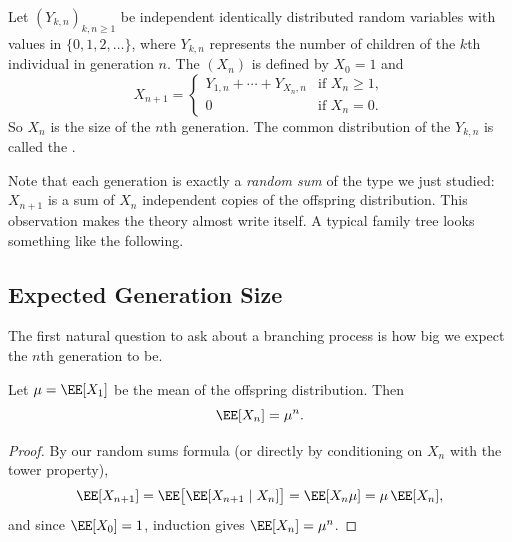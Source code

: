 \begin{definition}
	Let $(Y_{k, n})_{k, n \geq 1}$ be independent identically distributed random variables with values in $\{0, 1, 2, \dots\}$, where $Y_{k, n}$ represents the number of children of the $k$th individual in generation $n$. The  $(X_n)$ is defined by $X_0 = 1$ and
	$$
	X_{n + 1} = \begin{cases}
		Y_{1, n} + \cdots + Y_{X_n, n} & \text{if } X_n \geq 1, \\
		0 & \text{if } X_n = 0.
	\end{cases}
	$$
	So $X_n$ is the size of the $n$th generation. The common distribution of the $Y_{k,n}$ is called the .
\end{definition}

Note that each generation is exactly a \emph{random sum} of the type we just studied: $X_{n+1}$ is a sum of $X_n$ independent copies of the offspring distribution. This observation makes the theory almost write itself. A typical family tree looks something like the following.

\begin{center}
\end{center}

\subsection{Expected Generation Size}

The first natural question to ask about a branching process is how big we expect the $n$th generation to be.

\begin{theorem}
	Let $\mu = \EE[X_1]$ be the mean of the offspring distribution. Then
	$$
	\EE[X_n] = \mu^n.
	$$
\end{theorem}
\begin{proof}
	By our random sums formula (or directly by conditioning on $X_n$ with the tower property),
	$$
	\EE[X_{n + 1}] = \EE\big[\EE[X_{n+1} \mid X_n]\big] = \EE[X_n \mu] = \mu\, \EE[X_n],
	$$
	and since $\EE[X_0] = 1$, induction gives $\EE[X_n] = \mu^n$.
\end{proof}

